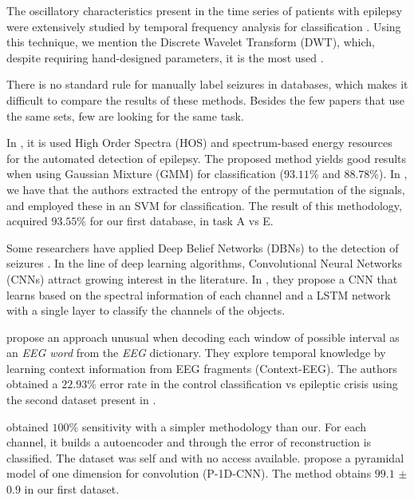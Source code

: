 The oscillatory characteristics present in the time series of patients with epilepsy were extensively studied by temporal frequency analysis for classification \cite{saab2005system,kuhlmann2009seizure,shoeb2004patient,shoeb2011machine}. Using this technique, we mention the Discrete Wavelet Transform (DWT), which, despite requiring hand-designed parameters, it is the most used \cite{ullah2018automated}.

There is no standard rule for manually label seizures in databases, which makes it difficult to compare the results of these methods. Besides the few papers that use the same sets, few are looking for the same task.

In \cite{chua2011application}, it is used High Order Spectra (HOS) and spectrum-based energy resources for the automated detection of epilepsy. The proposed method yields good results when using Gaussian Mixture (GMM) for classification ($93.11\%$ and $88.78\%$). In \cite{nicolaou2012detection}, we have that the authors extracted the entropy of the permutation of the signals, and employed these in an SVM for classification. The result of this methodology, acquired $93.55\%$ for our first database, in task A vs E.

Some researchers have applied Deep Belief Networks (DBNs) to the detection of seizures \cite{acharya2018deep}. In the line of deep learning algorithms, Convolutional Neural Networks (CNNs) attract growing interest in the literature. In \cite{hussein2018epileptic}, they propose a CNN that learns based on the spectral information of each channel and a LSTM network with a single layer to classify the channels of the objects. 

\cite{xun2016detecting} propose an approach unusual when decoding each window of possible interval as an {\it EEG word} from the {\it EEG} dictionary. They explore temporal knowledge by learning context information from EEG fragments (Context-EEG). The authors obtained a $22.93\%$ error rate in the control classification vs epileptic crisis using the second dataset present in \cite{WenZha:2018}. 

\cite{emami2019autoencoding} obtained $100\%$ sensitivity with a simpler methodology than our. For each channel, it builds a autoencoder and through the error of reconstruction is classified. The dataset was self and with no access available. \cite{ullah2018automated} propose a pyramidal model of one dimension for convolution (P-1D-CNN). The method obtains $99.1$ $\pm$ $0.9$ in our first dataset.

